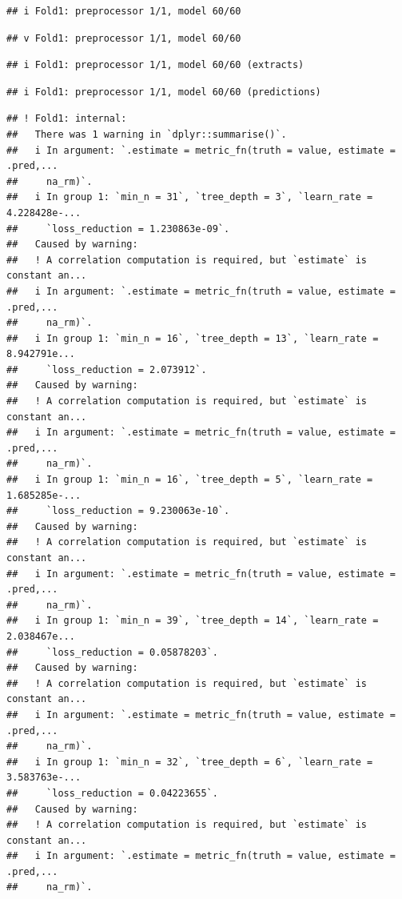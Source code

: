 \documentclass[
]{article}
\begin{document}
\begin{verbatim}
## i Fold1: preprocessor 1/1, model 60/60
\end{verbatim}

\begin{verbatim}
## v Fold1: preprocessor 1/1, model 60/60
\end{verbatim}

\begin{verbatim}
## i Fold1: preprocessor 1/1, model 60/60 (extracts)
\end{verbatim}

\begin{verbatim}
## i Fold1: preprocessor 1/1, model 60/60 (predictions)
\end{verbatim}

\begin{verbatim}
## ! Fold1: internal:
##   There was 1 warning in `dplyr::summarise()`.
##   i In argument: `.estimate = metric_fn(truth = value, estimate = .pred,...
##     na_rm)`.
##   i In group 1: `min_n = 31`, `tree_depth = 3`, `learn_rate = 4.228428e-...
##     `loss_reduction = 1.230863e-09`.
##   Caused by warning:
##   ! A correlation computation is required, but `estimate` is constant an...
##   i In argument: `.estimate = metric_fn(truth = value, estimate = .pred,...
##     na_rm)`.
##   i In group 1: `min_n = 16`, `tree_depth = 13`, `learn_rate = 8.942791e...
##     `loss_reduction = 2.073912`.
##   Caused by warning:
##   ! A correlation computation is required, but `estimate` is constant an...
##   i In argument: `.estimate = metric_fn(truth = value, estimate = .pred,...
##     na_rm)`.
##   i In group 1: `min_n = 16`, `tree_depth = 5`, `learn_rate = 1.685285e-...
##     `loss_reduction = 9.230063e-10`.
##   Caused by warning:
##   ! A correlation computation is required, but `estimate` is constant an...
##   i In argument: `.estimate = metric_fn(truth = value, estimate = .pred,...
##     na_rm)`.
##   i In group 1: `min_n = 39`, `tree_depth = 14`, `learn_rate = 2.038467e...
##     `loss_reduction = 0.05878203`.
##   Caused by warning:
##   ! A correlation computation is required, but `estimate` is constant an...
##   i In argument: `.estimate = metric_fn(truth = value, estimate = .pred,...
##     na_rm)`.
##   i In group 1: `min_n = 32`, `tree_depth = 6`, `learn_rate = 3.583763e-...
##     `loss_reduction = 0.04223655`.
##   Caused by warning:
##   ! A correlation computation is required, but `estimate` is constant an...
##   i In argument: `.estimate = metric_fn(truth = value, estimate = .pred,...
##     na_rm)`.

\end{verbatim}
\end{document}
